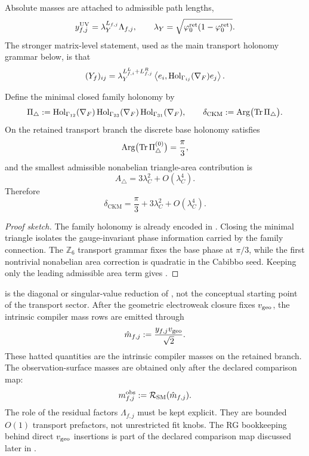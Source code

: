 Absolute masses are attached to admissible path lengths,
\begin{equation}
\label{eq:path-length-yukawa}
y_{f,j}^{\mathrm{UV}}=\lambda_Y^{L_{f,j}}\Lambda_{f,j},
\qquad
\lambda_Y=\sqrt{\varphi_0^{\mathrm{ret}}(1-\varphi_0^{\mathrm{ret}})}.
\end{equation}
The stronger matrix-level statement, used as the main transport holonomy grammar below, is that
\begin{equation}
\label{eq:yukawa-holonomy-matrix}
(Y_f)_{ij}
=
\lambda_Y^{L^L_{f,i}+L^R_{f,j}}
\left\langle e_i,\mathrm{Hol}_{\Gamma_{ij}}(\nabla_F)e_j\right\rangle.
\end{equation}
\begin{proposition}
\label{prop:holonomy-triangle-phase}
Define the minimal closed family holonomy by
\[
\Pi_\triangle
:=
\mathrm{Hol}_{\Gamma_{12}}(\nabla_F)\,
\mathrm{Hol}_{\Gamma_{23}}(\nabla_F)\,
\mathrm{Hol}_{\Gamma_{31}}(\nabla_F),
\qquad
\delta_{\mathrm{CKM}}
:=
\operatorname{Arg}\bigl(\operatorname{Tr}\Pi_\triangle\bigr).
\]
On the retained transport branch the discrete base holonomy satisfies
\[
\operatorname{Arg}\bigl(\operatorname{Tr}\Pi_\triangle^{(0)}\bigr)=\frac{\pi}{3},
\]
and the smallest admissible nonabelian triangle-area contribution is
\[
A_\triangle=3\lambda_C^2+O(\lambda_C^4).
\]
Therefore
\begin{equation}
\label{eq:ckm-holonomy-phase}
\delta_{\mathrm{CKM}}
=
\frac{\pi}{3}+3\lambda_C^2+O(\lambda_C^4).
\end{equation}
\end{proposition}

\begin{proof}[Proof sketch]
The family holonomy is already encoded in . Closing the minimal triangle isolates the gauge-invariant phase information carried by the family connection. The $\mathbb Z_6$ transport grammar fixes the base phase at $\pi/3$, while the first nontrivial nonabelian area correction is quadratic in the Cabibbo seed. Keeping only the leading admissible area term gives .
\end{proof}

 is the diagonal or singular-value reduction of , not the conceptual starting point of the transport sector.
After the geometric electroweak closure fixes $v_{\mathrm{geo}}$, the intrinsic compiler mass rows are emitted through
\begin{equation}
\label{eq:mass-bridge}
\hat m_{f,j}:=\frac{y_{f,j}v_{\mathrm{geo}}}{\sqrt2}.
\end{equation}
These hatted quantities are the intrinsic compiler masses on the retained branch. The observation-surface masses are obtained only after the declared comparison map:
\[
m_{f,j}^{\mathrm{obs}}:=\mathcal R_{\mathrm{SM}}(\hat m_{f,j}).
\]
The role of the residual factors $\Lambda_{f,j}$ must be kept explicit. They are bounded $O(1)$ transport prefactors, not unrestricted fit knobs. The RG bookkeeping behind direct $v_{\mathrm{geo}}$ insertions is part of the declared comparison map discussed later in .

